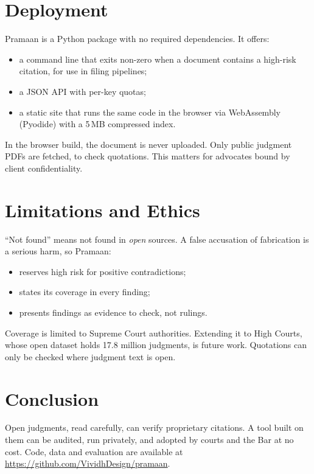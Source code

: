 \documentclass[sigconf,nonacm]{acmart}
\begin{document}
\section{Deployment}

Pramaan is a Python package with no required dependencies. It offers:
\begin{itemize}
\item a command line that exits non-zero when a document contains a high-risk citation, for use in
filing pipelines;
\item a JSON API with per-key quotas;
\item a static site that runs the same code in the browser via WebAssembly (Pyodide) with a 5\,MB
compressed index.
\end{itemize}
In the browser build, the document is never uploaded. Only public judgment PDFs are fetched, to check
quotations. This matters for advocates bound by client confidentiality.

\section{Limitations and Ethics}

``Not found'' means not found in \emph{open} sources. A false accusation of fabrication is a serious
harm, so Pramaan:
\begin{itemize}
\item reserves high risk for positive contradictions;
\item states its coverage in every finding;
\item presents findings as evidence to check, not rulings.
\end{itemize}
Coverage is limited to Supreme Court authorities. Extending it to High Courts, whose open dataset
holds 17.8 million judgments, is future work. Quotations can only be checked where judgment text is
open.

\section{Conclusion}

Open judgments, read carefully, can verify proprietary citations. A tool built on them can be audited,
run privately, and adopted by courts and the Bar at no cost. Code, data and evaluation are available at
\url{https://github.com/VividhDesign/pramaan}.



\end{document}
